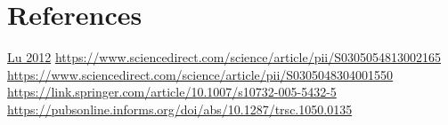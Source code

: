 \documentclass[a4paper,12pt]{article}
\begin{document}
\section{References} \label{sec:Ref}

\href{http://www-bcf.usc.edu/~maged/publications/MultiplePickup.pdf}{Lu 2012} \newline
\url{https://www.sciencedirect.com/science/article/pii/S0305054813002165} \newline
\url{https://www.sciencedirect.com/science/article/pii/S0305048304001550} \newline
\url{https://link.springer.com/article/10.1007/s10732-005-5432-5} \newline
\url{https://pubsonline.informs.org/doi/abs/10.1287/trsc.1050.0135} \newline
\end{document}

